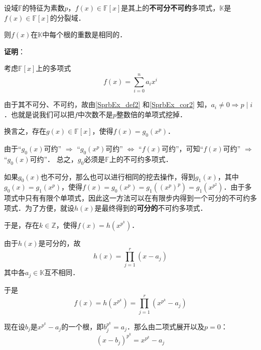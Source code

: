 





\begin{theorem}{}\label{SprbEx_the3}
设域$\mathbb{F}$的特征为素数$p$，$f(x)\in\mathbb{F}[x]$是其上的\textbf{不可分不可约}多项式，$\mathbb{K}$是$f(x)\in\mathbb{F}[x]$的分裂域．

则$f(x)$在$\mathbb{K}$中每个根的重数是相同的．
\end{theorem}

\textbf{证明}：

考虑$\mathbb{F}[x]$上的多项式
\begin{equation}
f(x) = \sum_{i=0}^n a_ix^i
\end{equation}


由于其不可分、不可约，故由\autoref{SprbEx_def2} 和\autoref{SprbEx_cor2} 知，$a_i\neq 0 \Rightarrow p\mid i$．也就是说我们可以把$f$中次数不是$p$整数倍的单项式挖掉．

换言之，存在$g(x)\in\mathbb{F}[x]$，使得$f(x)=g_0(x^p)$．

由于“$g_0(x)$可约” $\Rightarrow$ “$g_0(x^p)$可约” $\iff$ “$f(x)$可约”，可知“$f(x)$可约” $\Rightarrow$ “$g_0(x)$可约”． 总之，$g_0$必须是$\mathbb{F}$上的不可约多项式．

如果$g_0(x)$也不可分，那么也可以进行相同的挖去操作，得到$g_1(x)$，其中$g_0(x) = g_1(x^p)$，使得$f(x) = g_0(x^p) = g_1((x^p)^p) = g_1(x^{p^2})$．由于多项式中只有有限个单项式，因此这一方法可以在有限步内得到一个可分的不可约多项式．为了方便，就设$h(x)$是最终得到的\textbf{可分的}不可约多项式．

于是，存在$k\in\mathbb{Z}$，使得$f(x) = h(x^{p^k})$．

由于$h(x)$是可分的，故
\begin{equation}
h(x) = \prod_{j=1}^{r}(x-a_j)
\end{equation}
其中各$a_j\in\mathbb{K}$互不相同．

于是
\begin{equation}
f(x) = h(x^{p^k}) = \prod_{j=1}^{r}(x^{p^k}-a_j)
\end{equation}

现在设$b_j$是$x^{p^k}-a_j$的一个根，即$b_j^{p^k}=a_j$．那么由二项式展开以及$p=0$：
\begin{equation}
(x-b_j)^{p^k} = x^{p^k}-a_j
\end{equation}

